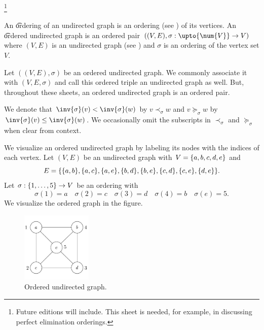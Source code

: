 
  \ifhmode\unskip\fi\footnote{
Future editions will include. This sheet is needed, for example, in discussing perfect elimination orderings.
  }


An \t{ordering} of an undirected graph is an ordering (see ) of its vertices.
An \t{ordered undirected graph} is an ordered pair $((V, E), \sigma: \upto{\num{V}} \to V)$ where $(V, E)$ is an undirected graph (see ) and $\sigma$ is an ordering of the vertex set $V$.


Let $((V, E), \sigma)$ be an ordered undirected graph.
We commonly associate it with $(V, E, \sigma)$ and call this ordered triple an undirected graph as well.
But, throughout these sheets, an ordered undirected graph is an ordered pair.

We denote that $\inv{\sigma}(v) < \inv{\sigma}(w)$ by $v \prec_{\sigma} w$ and $v \succeq_{\sigma} w$ by $\inv{\sigma}(v) \leq \inv{\sigma}(w)$.
We occasionally omit the subscripts in $\prec_{\sigma}$ and $\succeq_{\sigma}$ when clear from context.


We visualize an ordered undirected graph by labeling its nodes with the indices of each vertex.
Let $(V, E)$ be an undirected graph with $V = \{a,b,c,d,e\}$ and
  \[
E = \set*{\set{a, b}, \set{a, c}, \set{a, e}, \set{b, d}, \set{b, e}, \set{c, d}, \set{c, e}, \set{d,e}}.
  \]
Let $\sigma: \{1, \dots, 5\} \to V$ be an ordering with
  \[
\sigma(1) = a \quad \sigma(2) = c \quad \sigma(3) = d \quad \sigma(4) = b \quad \sigma(e) = 5.
  \]
We visualize the ordered graph in the figure.

\begin{figure}
\centering
\includegraphics[width=0.3\textwidth]{graphics_included/ordered_undirected_graph}
\caption{Ordered undirected graph.}
\end{figure}
